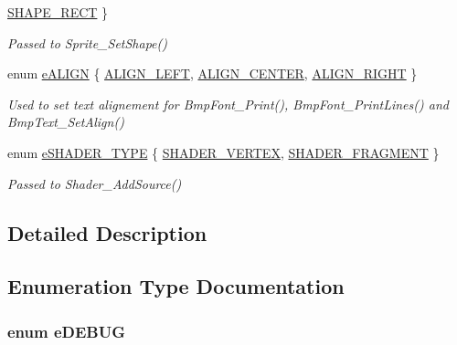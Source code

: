 \begin{DoxyCompactItemize}
\hyperlink{group____enums_gae0bb4ff64a099c5102636dd24f9bb689a8a9acb6e59fd56507b5a6c911ed3be1f}{S\-H\-A\-P\-E\-\_\-\-R\-E\-C\-T}
 \}
\begin{DoxyCompactList}\small\item\em Passed to Sprite\-\_\-\-Set\-Shape() \end{DoxyCompactList}\item 
enum \hyperlink{group____enums_gaac80427f9477ee00ef59c4372b7fb4e4}{e\-A\-L\-I\-G\-N} \{ \hyperlink{group____enums_gaac80427f9477ee00ef59c4372b7fb4e4a6ec599857e15466988726932dd592305}{A\-L\-I\-G\-N\-\_\-\-L\-E\-F\-T}, 
\hyperlink{group____enums_gaac80427f9477ee00ef59c4372b7fb4e4a5624165187e56db612253e608a45b1c6}{A\-L\-I\-G\-N\-\_\-\-C\-E\-N\-T\-E\-R}, 
\hyperlink{group____enums_gaac80427f9477ee00ef59c4372b7fb4e4a9c81840e8cad46418b39a8b74a246354}{A\-L\-I\-G\-N\-\_\-\-R\-I\-G\-H\-T}
 \}
\begin{DoxyCompactList}\small\item\em Used to set text alignement for Bmp\-Font\-\_\-\-Print(), Bmp\-Font\-\_\-\-Print\-Lines() and Bmp\-Text\-\_\-\-Set\-Align() \end{DoxyCompactList}\item 
enum \hyperlink{group____enums_ga75981166aeb71a0a556f502ba86f70ea}{e\-S\-H\-A\-D\-E\-R\-\_\-\-T\-Y\-P\-E} \{ \hyperlink{group____enums_ga75981166aeb71a0a556f502ba86f70eaab62456e14277187d6784e3b66fe87266}{S\-H\-A\-D\-E\-R\-\_\-\-V\-E\-R\-T\-E\-X}, 
\hyperlink{group____enums_ga75981166aeb71a0a556f502ba86f70eaacccd4011b6a887964b70f3c862e9a169}{S\-H\-A\-D\-E\-R\-\_\-\-F\-R\-A\-G\-M\-E\-N\-T}
 \}
\begin{DoxyCompactList}\small\item\em Passed to Shader\-\_\-\-Add\-Source() \end{DoxyCompactList}\end{DoxyCompactItemize}


\subsection{Detailed Description}


\subsection{Enumeration Type Documentation}
\hypertarget{group____enums_gaa768cfbfa3bdcb70751d9e3c37b00350}{
\subsubsection[{e\-D\-E\-B\-U\-G}]{\setlength{\rightskip}{0pt plus 5cm}enum {\bf e\-D\-E\-B\-U\-G}}}\label{group____enums_gaa768cfbfa3bdcb70751d9e3c37b00350}


